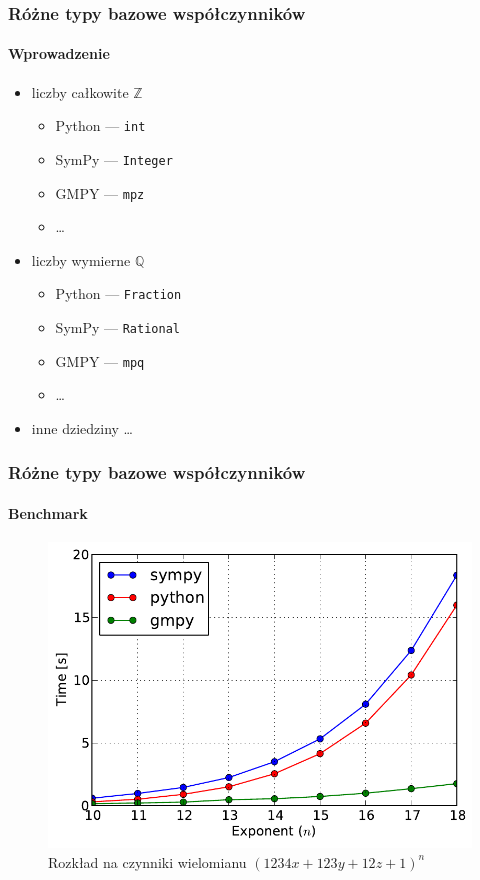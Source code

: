 \documentclass{beamer}
\begin{document}
\begin{frame}
    \frametitle{Różne typy bazowe współczynników}
    \framesubtitle{Wprowadzenie}

    \begin{itemize}
        \item liczby całkowite $\mathbb{Z}$
            \begin{itemize}
                \item Python --- \texttt{int}
                \item SymPy --- \texttt{Integer}
                \item GMPY  --- \texttt{mpz}
                \item \ldots
            \end{itemize}
        \pause
        \item liczby wymierne $\mathbb{Q}$
            \begin{itemize}
                \item Python --- \texttt{Fraction}
                \item SymPy --- \texttt{Rational}
                \item GMPY  --- \texttt{mpq}
                \item \ldots
            \end{itemize}
        \pause
        \item inne dziedziny \ldots
    \end{itemize}
\end{frame}

\begin{frame}
    \frametitle{Różne typy bazowe współczynników}
    \framesubtitle{Benchmark}

    \begin{figure}
        \begin{center}
            \includegraphics[scale=0.55]{images/ground-factor-large.pdf}
        \end{center}
        \caption{Rozkład na czynniki wielomianu $(1234 x + 123 y + 12 z + 1)^n$}
    \end{figure}
\end{frame}
\end{document}
